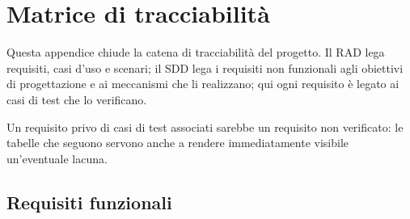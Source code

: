 \chapter{Matrice di tracciabilità}
\label{cap:td-app-tracciabilita}

Questa appendice chiude la catena di tracciabilità del progetto. Il RAD lega
requisiti, casi d'uso e scenari; il SDD lega i requisiti non funzionali agli
obiettivi di progettazione e ai meccanismi che li realizzano; qui ogni
requisito è legato ai casi di test che lo verificano.

Un requisito privo di casi di test associati sarebbe un requisito non
verificato: le tabelle che seguono servono anche a rendere immediatamente
visibile un'eventuale lacuna.

\section{Requisiti funzionali}

